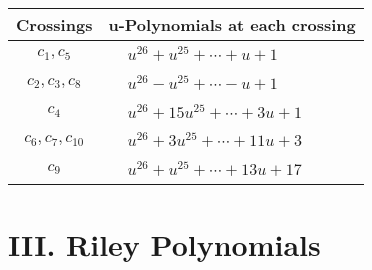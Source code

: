 \documentclass[1p]{elsarticle_modified}
\theoremstyle{definition}
\begin{document}
\begin{tabular}{m{50pt}|m{274pt}}
Crossings & \hspace{64pt}u-Polynomials at each crossing \\
\hline $$\begin{aligned}c_{1},c_{5}\end{aligned}$$&$\begin{aligned}
&u^{26}+u^{25}+\cdots+u+1
\end{aligned}$\\
\hline $$\begin{aligned}c_{2},c_{3},c_{8}\end{aligned}$$&$\begin{aligned}
&u^{26}- u^{25}+\cdots- u+1
\end{aligned}$\\
\hline $$\begin{aligned}c_{4}\end{aligned}$$&$\begin{aligned}
&u^{26}+15 u^{25}+\cdots+3 u+1
\end{aligned}$\\
\hline $$\begin{aligned}c_{6},c_{7},c_{10}\end{aligned}$$&$\begin{aligned}
&u^{26}+3 u^{25}+\cdots+11 u+3
\end{aligned}$\\
\hline $$\begin{aligned}c_{9}\end{aligned}$$&$\begin{aligned}
&u^{26}+u^{25}+\cdots+13 u+17
\end{aligned}$\\
\hline
\end{tabular}\newpage\renewcommand{\arraystretch}{1}
\centering \section*{ III. Riley Polynomials}
\end{document}
